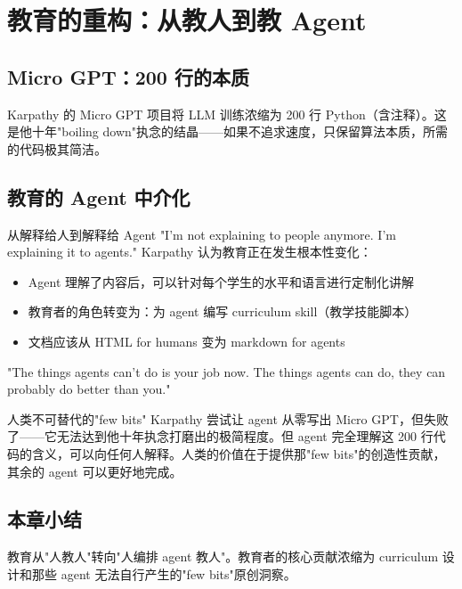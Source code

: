 \section{教育的重构：从教人到教 Agent}

\subsection{Micro GPT：200 行的本质}

Karpathy 的 Micro GPT 项目将 LLM 训练浓缩为 200 行 Python（含注释）。这是他十年"boiling down"执念的结晶——如果不追求速度，只保留算法本质，所需的代码极其简洁。

\subsection{教育的 Agent 中介化}

\begin{importantbox}{从解释给人到解释给 Agent}
"I'm not explaining to people anymore. I'm explaining it to agents." Karpathy 认为教育正在发生根本性变化：
\begin{itemize}
    \item Agent 理解了内容后，可以针对每个学生的水平和语言进行定制化讲解
    \item 教育者的角色转变为：为 agent 编写 curriculum skill（教学技能脚本）
    \item 文档应该从 HTML for humans 变为 markdown for agents
\end{itemize}
"The things agents can't do is your job now. The things agents can do, they can probably do better than you."
\end{importantbox}

\begin{knowledgebox}{人类不可替代的"few bits"}
Karpathy 尝试让 agent 从零写出 Micro GPT，但失败了——它无法达到他十年执念打磨出的极简程度。但 agent 完全理解这 200 行代码的含义，可以向任何人解释。人类的价值在于提供那"few bits"的创造性贡献，其余的 agent 可以更好地完成。
\end{knowledgebox}

\subsection{本章小结}

教育从"人教人"转向"人编排 agent 教人"。教育者的核心贡献浓缩为 curriculum 设计和那些 agent 无法自行产生的"few bits"原创洞察。


